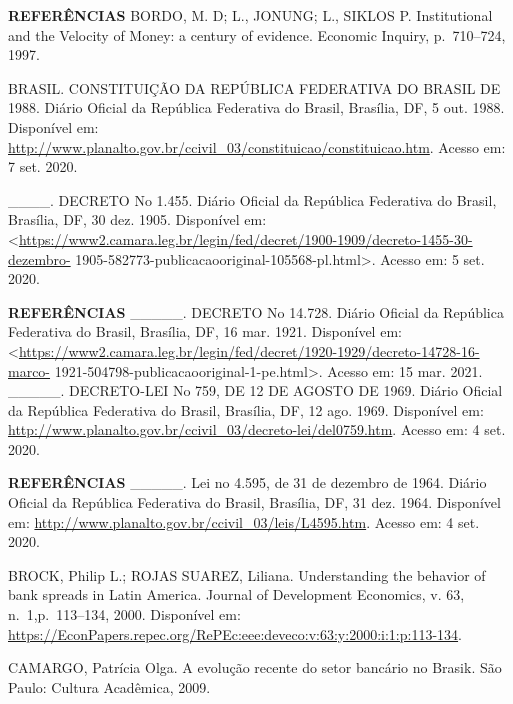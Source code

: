 \documentclass[
  ignorenonframetext,
  aspectratio=169,
  ignorenonframetext]{beamer}
\begin{document}
\begin{frame}{\textbf{REFERÊNCIAS}}
\protect\hypertarget{referuxeancias-5}{}
BORDO, M. D; L., JONUNG; L., SIKLOS P. Institutional and the Velocity of
Money: a century of evidence. Economic Inquiry, p.~710--724, 1997.

BRASIL. CONSTITUIÇÃO DA REPÚBLICA FEDERATIVA DO BRASIL DE 1988. Diário
Oficial da República Federativa do Brasil, Brasília, DF, 5 out. 1988.
Disponível em:
\url{http://www.planalto.gov.br/ccivil_03/constituicao/constituicao.htm}.
Acesso em: 7 set. 2020.

\_\_\_\_. DECRETO No 1.455. Diário Oficial da República Federativa do
Brasil, Brasília, DF, 30 dez. 1905. Disponível em:
\textless{}\url{https://www2.camara.leg.br/legin/fed/decret/1900-1909/decreto-1455-30-dezembro-}
1905-582773-publicacaooriginal-105568-pl.html\textgreater. Acesso em: 5
set. 2020.
\end{frame}

\begin{frame}{\textbf{REFERÊNCIAS}}
\protect\hypertarget{referuxeancias-6}{}
\_\_\_\_\_. DECRETO No 14.728. Diário Oficial da República Federativa do
Brasil, Brasília, DF, 16 mar. 1921. Disponível em:
\textless{}\url{https://www2.camara.leg.br/legin/fed/decret/1920-1929/decreto-14728-16-marco-}
1921-504798-publicacaooriginal-1-pe.html\textgreater. Acesso em: 15 mar.
2021. \_\_\_\_\_. DECRETO-LEI No 759, DE 12 DE AGOSTO DE 1969. Diário
Oficial da República Federativa do Brasil, Brasília, DF, 12 ago. 1969.
Disponível em:
\url{http://www.planalto.gov.br/ccivil_03/decreto-lei/del0759.htm}.
Acesso em: 4 set. 2020.
\end{frame}

\begin{frame}{\textbf{REFERÊNCIAS}}
\protect\hypertarget{referuxeancias-7}{}
\_\_\_\_\_. Lei no 4.595, de 31 de dezembro de 1964. Diário Oficial da
República Federativa do Brasil, Brasília, DF, 31 dez. 1964. Disponível
em: \url{http://www.planalto.gov.br/ccivil_03/leis/L4595.htm}. Acesso
em: 4 set. 2020.

BROCK, Philip L.; ROJAS SUAREZ, Liliana. Understanding the behavior of
bank spreads in Latin America. Journal of Development Economics, v. 63,
n.~1,p.~113--134, 2000. Disponível em:
\url{https://EconPapers.repec.org/RePEc:eee:deveco:v:63:y:2000:i:1:p:113-134}.

CAMARGO, Patrícia Olga. A evolução recente do setor bancário no Brasik.
São Paulo: Cultura Acadêmica, 2009.
\end{frame}
\end{document}
